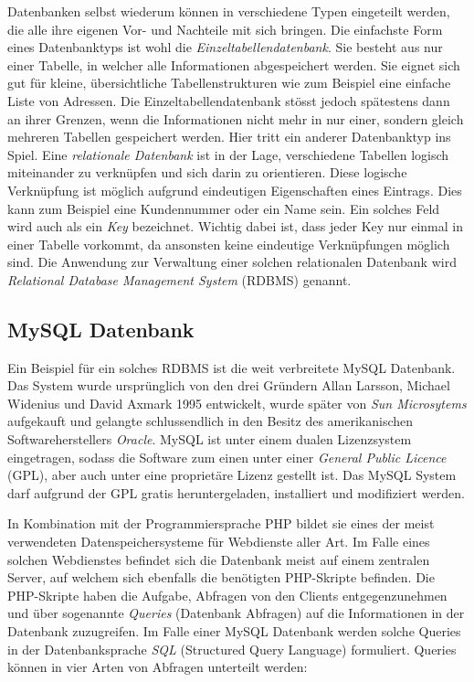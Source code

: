 \documentclass[a4paper,11pt]{report}
\begin{document}
			Datenbanken selbst wiederum können in  verschiedene Typen eingeteilt werden, die alle ihre eigenen Vor- und Nachteile mit sich bringen. Die einfachste Form eines Datenbanktyps ist wohl die \emph{Einzeltabellendatenbank}. Sie besteht aus nur einer Tabelle, in welcher alle Informationen abgespeichert werden. Sie eignet sich gut für kleine, übersichtliche Tabellenstrukturen wie zum Beispiel eine einfache Liste von Adressen. Die Einzeltabellendatenbank stösst jedoch spätestens dann an ihrer Grenzen, wenn die Informationen nicht mehr in nur einer, sondern gleich mehreren Tabellen gespeichert werden. Hier tritt ein anderer Datenbanktyp ins Spiel. Eine \emph{relationale Datenbank} ist in der Lage, verschiedene Tabellen logisch miteinander zu verknüpfen und sich darin zu orientieren. Diese logische Verknüpfung ist möglich aufgrund eindeutigen Eigenschaften eines Eintrags. Dies kann zum Beispiel eine Kundennummer oder ein Name sein. Ein solches Feld wird auch als ein \emph{Key} bezeichnet. Wichtig dabei ist, dass jeder Key nur einmal in einer Tabelle vorkommt, da ansonsten keine eindeutige Verknüpfungen möglich sind. Die Anwendung zur Verwaltung einer solchen relationalen Datenbank wird \emph{Relational Database Management System} (RDBMS) genannt. \cite[S. 745 - 751]{IT-Handbuch}

				\subsection{MySQL Datenbank}
				Ein Beispiel für ein solches RDBMS ist die weit verbreitete MySQL Datenbank. Das System wurde ursprünglich von den drei Gründern Allan Larsson, Michael Widenius und David Axmark 1995 entwickelt, wurde später von \emph{Sun Microsytems} aufgekauft und gelangte schlussendlich in den Besitz des amerikanischen Softwareherstellers \emph{Oracle}. MySQL ist unter einem dualen Lizenzsystem eingetragen, sodass die Software zum einen unter einer \emph{General Public Licence} (GPL), aber auch unter eine proprietäre Lizenz gestellt ist. \cite{tecmint.com} Das MySQL System darf aufgrund der GPL gratis heruntergeladen, installiert und modifiziert werden.
				
				In Kombination mit der Programmiersprache PHP bildet sie eines der meist verwendeten Datenspeichersysteme für Webdienste aller Art. Im Falle eines solchen Webdienstes befindet sich die Datenbank meist auf einem zentralen Server, auf welchem sich ebenfalls die benötigten PHP-Skripte befinden. Die PHP-Skripte haben die Aufgabe, Abfragen von den Clients entgegenzunehmen und über sogenannte \emph{Queries} (Datenbank Abfragen) auf die Informationen in der Datenbank zuzugreifen. Im Falle einer MySQL Datenbank werden solche Queries in der Datenbanksprache \emph{SQL} (Structured Query Language) formuliert. Queries können in vier Arten von Abfragen unterteilt werden: \cite[S. 760]{IT-Handbuch}
				
\end{document}
